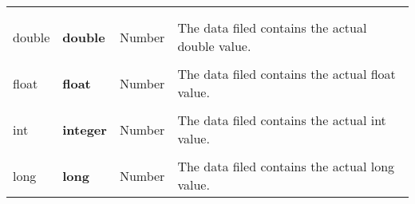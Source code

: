 \begin{longtable}{|p{}|p{}p{}p{}|}
\begin{minipage}[t]{0.37\textwidth}
			\end{minipage}\\%
			&&&\\
			\centering double & \begin{minipage}[t]{0.17\textwidth}
				\centering
				\textbf{double}
			\end{minipage} & \begin{minipage}[t]{0.17\textwidth}
				\centering
				Number
			\end{minipage} & \begin{minipage}[t]{0.37\textwidth}
				The data filed contains the actual double value.
			\end{minipage}\\%
			&&&\\
			\centering float & \begin{minipage}[t]{0.17\textwidth}
				\centering
				\textbf{float}
			\end{minipage} & \begin{minipage}[t]{0.17\textwidth}
				\centering
				Number
			\end{minipage} & \begin{minipage}[t]{0.37\textwidth}
				The data filed contains the actual float value.
			\end{minipage}\\%
			&&&\\
			\centering int & \begin{minipage}[t]{0.17\textwidth}
				\centering
				\textbf{integer}
			\end{minipage} & \begin{minipage}[t]{0.17\textwidth}
				\centering
				Number
			\end{minipage} & \begin{minipage}[t]{0.37\textwidth}
				The data filed contains the actual int value.
			\end{minipage}\\%
			&&&\\
			\centering long & \begin{minipage}[t]{0.17\textwidth}
				\centering
				\textbf{long}
			\end{minipage} & \begin{minipage}[t]{0.17\textwidth}
				\centering
				Number
			\end{minipage} & \begin{minipage}[t]{0.37\textwidth}
				The data filed contains the actual long value.

\end{minipage}
\end{longtable}
